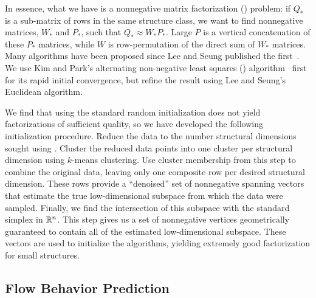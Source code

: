 \documentclass{acm_proc_article-sp}
\begin{document}
In essence, what we have is a nonnegative matrix factorization () problem:
if $Q_*$ is a sub-matrix of rows in the same structure class, we want to find nonnegative matrices, $W_*$ and $P_*$, such that $Q_* \approx W_* P_*$.
Large $P$ is a vertical concatenation of these $P_*$ matrices, while $W$ is row-permutation of the direct sum of $W_*$ matrices.
Many  algorithms have been proposed since Lee and Seung published the first~\cite{Lee01}.
We use Kim and Park's alternating non-negative least squares () algorithm~\cite{Kim08:anls} first for its rapid initial convergence, but refine the result using Lee and Seung's Euclidean algorithm.


We find that using the standard random  initialization does not yield factorizations of sufficient quality, so we have developed the following initialization procedure.
Reduce the data to the number structural dimensions sought using .
Cluster the reduced data points into one cluster per structural dimension using $k$-means clustering.
Use cluster membership from this step to combine the original data, leaving only one composite row per desired structural dimension.
These rows provide a ``denoised'' set of nonnegative spanning vectors that estimate the true low-dimensional subspace from which the data were sampled.
Finally, we find the intersection of this subspace with the standard simplex in $\mathbb{R}^n$.\cddnote
This step gives us a set of nonnegative vertices geometrically guaranteed to contain all of the estimated low-dimensional subspace.
These vectors are used to initialize the  algorithms, yielding extremely good factorization for small structures.

\subsection{Flow Behavior Prediction}
\end{document}
